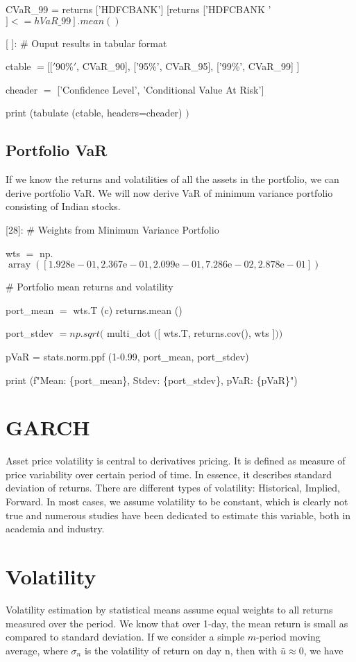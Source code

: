 \documentclass[10pt]{article}
\begin{document}
CVaR\_99 = returns ['HDFCBANK'] [returns ['HDFCBANK ' $\left.]<=h V a R \_99\right] . m e a n()$

[ ]: \# Ouput results in tabular format

ctable $=[[' 90 \% '$, CVaR\_90], ['95\%', CVaR\_95], ['99\%', CVaR\_99] ]

cheader $=$ ['Confidence Level', 'Conditional Value At Risk']

print (tabulate (ctable, headers=cheader) $)$

\subsection*{Portfolio VaR}
If we know the returns and volatilities of all the assets in the portfolio, we can derive portfolio VaR. We will now derive VaR of minimum variance portfolio consisting of Indian stocks.

[28]: \# Weights from Minimum Variance Portfolio

wts $=$ np. $\operatorname{array}([1.928 \mathrm{e}-01,2.367 \mathrm{e}-01,2.099 \mathrm{e}-01,7.286 \mathrm{e}-02,2.878 \mathrm{e}-01])$

\# Portfolio mean returns and volatility

port\_mean $=$ wts.T (c) returns.mean ()

port\_stdev $=n p . s q r t($ multi\_dot $([$ wts.T, returns.cov(), wts $]))$

pVaR = stats.norm.ppf (1-0.99, port\_mean, port\_stdev)

print (f"Mean: \{port\_mean\}, Stdev: \{port\_stdev\}, pVaR: \{pVaR\}")

\section*{GARCH}
Asset price volatility is central to derivatives pricing. It is defined as measure of price variability over certain period of time. In essence, it describes standard deviation of returns. There are different types of volatility: Historical, Implied, Forward. In most cases, we assume volatility to be constant, which is clearly not true and numerous studies have been dedicated to estimate this variable, both in academia and industry.

\section*{Volatility}
Volatility estimation by statistical means assume equal weights to all returns measured over the period. We know that over 1-day, the mean return is small as compared to standard deviation. If we consider a simple $m$-period moving average, where $\sigma_{n}$ is the volatility of return on day $\mathrm{n}$, then with $\bar{u} \approx 0$, we have
\end{document}

